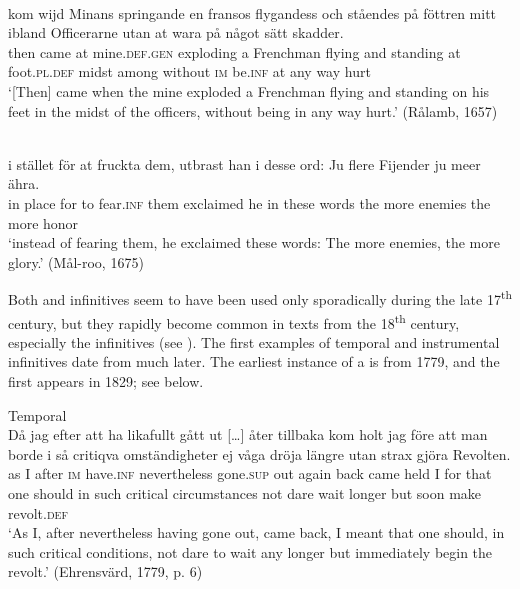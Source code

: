 \documentclass[output=paper]{langscibook}
\begin{document}
\ea
\label{ex:kalm:12}
\ea {}\\\label{ex:kalm:12a}
\gll[Då] kom wijd Minans springande en fransos flygandess och ståendes på föttren       mitt ibland Officerarne utan at wara på något sätt skadder.\\
then came at mine.\textsc{def.gen} exploding a Frenchman flying and standing at foot.\textsc{pl.def} midst among without \textsc{im} be.\textsc{inf} at any way hurt \\ 
\glt ‘[Then] came when the mine exploded a Frenchman flying and standing on his feet in the midst of the officers, without being in any way hurt.’ (Rålamb, 1657)

\ex {}\\\label{ex:kalm:12b}
\gll i stället för at fruckta dem, utbrast han i desse ord: Ju flere Fijender ju meer ähra.\\
 in place for to fear.\textsc{inf} them exclaimed he in these words the more enemies the more honor\\
\glt ‘instead of fearing them, he exclaimed these words: The more enemies, the more glory.’ (Mål-roo, 1675)
\z 
\z 


Both  and  infinitives seem to have been used only sporadically during the late 17\textsuperscript{th} century, but they rapidly become common in texts from the 18\textsuperscript{th} century, especially the  infinitives (see \citealt[129–130]{Kalm2016Satsekvivalenta}). The first examples of temporal and instrumental infinitives date from much later. The earliest instance of a  is from 1779, and the first  appears in 1829; see  below.  

\ea
\label{ex:kalm:13}
\ea Temporal\label{ex:kalm:13a}\\
\gll Då jag efter att ha likafullt gått {ut […]} åter tillbaka kom holt jag före att man borde i så critiqva omständigheter ej våga dröja längre utan strax gjöra Revolten.\\
as I after \textsc{im} have.\textsc{inf} nevertheless gone.\textsc{sup} out again back came held I for that one should in such critical circumstances not dare wait longer but soon make revolt.\textsc{def}\\
\glt ‘As I, after nevertheless having gone out, came back, I meant that one should, in such critical conditions, not dare to wait any longer but immediately begin the revolt.’ (Ehrensvärd, 1779, p. 6)
\end{document}
